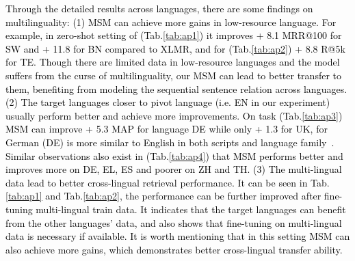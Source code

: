 \textcolor{black}{
Through the detailed results across languages, there are some findings on multilinguality: (1) MSM can achieve more gains in low-resource language. For example, in zero-shot setting of \tydi (Tab.\ref{tab:ap1}) it improves + 8.1 MRR@100 for SW and + 11.8 for BN compared to XLMR, and for \xor (Tab.\ref{tab:ap2}) + 8.8 R@5k for TE. Though there are limited data in low-resource languages and the model suffers from the curse of multilinguality, our MSM can lead to better transfer to them, benefiting from modeling the sequential sentence relation across languages. (2) The target languages closer to pivot language (i.e. EN in our experiment) usually perform better and achieve more improvements. On \news task (Tab.\ref{tab:ap3}) MSM can improve + 5.3 MAP for language DE while only + 1.3 for UK, for German (DE) is more similar to English in both scripts and language family~\citep{ruder-etal-2021-xtreme}. Similar observations also exist in \lqa (Tab.\ref{tab:ap4}) that MSM performs better and improves more on DE, EL, ES and poorer on ZH and TH. (3) The multi-lingual data lead to better cross-lingual retrieval performance. It can be seen in Tab.\ref{tab:ap1} and Tab.\ref{tab:ap2}, the performance can be further improved after fine-tuning multi-lingual train data. It indicates that the target languages can benefit from the other languages' data, and also shows that fine-tuning on multi-lingual data is necessary if available. It is worth mentioning that in this setting MSM can also achieve more gains, which demonstrates better cross-lingual transfer ability.
}



